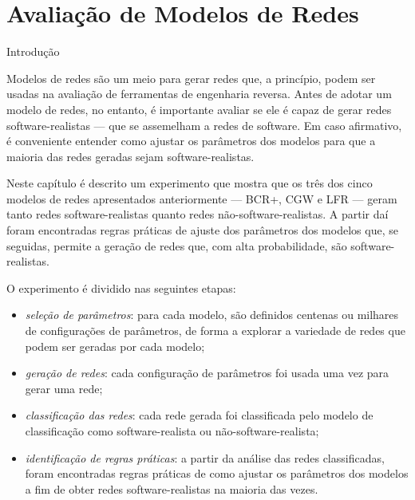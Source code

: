 \chapter{Avaliação de Modelos de Redes} \label{cap:avaliacao}

%


\begin{section}{Introdução}

	Modelos de redes são um meio para gerar redes que, a princípio, podem ser usadas na avaliação de ferramentas de engenharia reversa. Antes de adotar um modelo de redes, no entanto, é importante avaliar se ele é capaz de gerar redes software-realistas --- que se assemelham a redes de software. Em caso afirmativo, é conveniente entender como ajustar os parâmetros dos modelos para que a maioria das redes geradas sejam software-realistas.

	Neste capítulo é descrito um experimento que mostra que os três dos cinco modelos de redes apresentados anteriormente --- BCR+, CGW e LFR --- geram tanto redes software-realistas quanto redes não-software-realistas. A partir daí foram encontradas regras práticas de ajuste dos parâmetros dos modelos que, se seguidas, permite a geração de redes que, com alta probabilidade, são software-realistas.
	
	O experimento é dividido nas seguintes etapas:
	
	\begin{itemize}
		\item \emph{seleção de parâmetros}: para cada modelo, são definidos centenas ou milhares de configurações de parâmetros, de forma a explorar a variedade de redes que podem ser geradas por cada modelo;
		\item \emph{geração de redes}: cada configuração de parâmetros foi usada uma vez para gerar uma rede;
		\item \emph{classificação das redes}: cada rede gerada foi classificada pelo modelo de classificação como software-realista ou não-software-realista;
		\item \emph{identificação de regras práticas}: a partir da análise das redes classificadas, foram encontradas regras práticas de como ajustar os parâmetros dos modelos a fim de obter redes software-realistas na maioria das vezes.
	\end{itemize}

\end{section}


